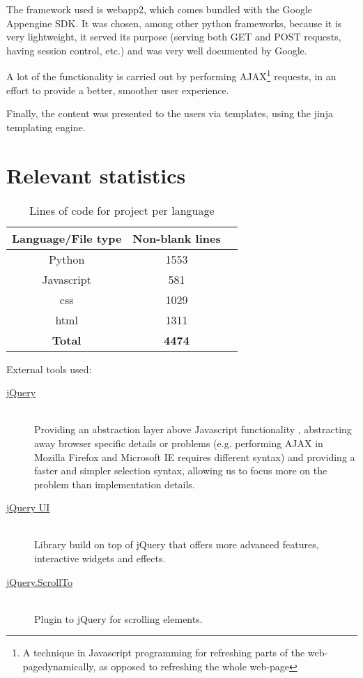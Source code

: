 \documentclass[12pt,a4paper,titlepage]{article}
\begin{document}
The framework used is webapp2, which comes bundled with the Google Appengine SDK. It was chosen, among other python frameworks, because it is very lightweight, it served its purpose (serving both GET and POST requests, having session control, etc.) and was very well documented by Google. 

A lot of the functionality is carried out by performing AJAX\footnote{A technique in Javascript programming for refreshing parts of the web-pagedynamically, as opposed to refreshing the whole web-page}  requests, in an effort to provide a better, smoother user experience.

Finally, the content was presented to the users via templates, using the jinja templating engine.
\newpage
\section{Relevant statistics}
\begin{table}[!htbp]
\centering
\begin{tabular}{| c |c |c|}
\hline
\bf{Language/File type} & \bf{Non-blank lines}\\
\hline
Python & 1553\\
\hline
Javascript & 581 \\
\hline
css & 1029 \\
\hline
html & 1311\\
\hline
\bf{Total} & \bf{4474}\\
\hline
\end{tabular}
\caption{Lines of code for project per language}
\end{table}
External tools used:
\begin{description}
\item[\href{http://jquery.com/}{jQuery}]\hfill\\
Providing an abstraction layer above Javascript functionality , abstracting away browser specific details or problems (e.g. performing AJAX in Mozilla Firefox and Microsoft IE requires different syntax) and providing a faster and simpler selection syntax, allowing us to focus more on the problem than implementation details.
\item[\href{http://jqueryui.com/}{jQuery UI}]\hfill\\
Library build on top of jQuery that offers more advanced features, interactive widgets and effects.
\item[\href{http://flesler.blogspot.co.uk/2007/10/jqueryscrollto.html}{jQuery.ScrollTo}]\hfill\\
Plugin to jQuery for scrolling elements.
\end{description}
\newpage
\end{document}
